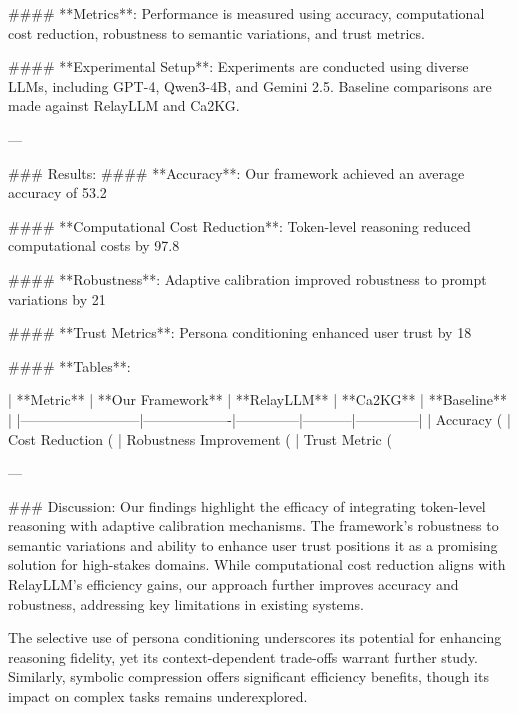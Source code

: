 #### **Metrics**:
Performance is measured using accuracy, computational cost reduction, robustness to semantic variations, and trust metrics.

#### **Experimental Setup**:
Experiments are conducted using diverse LLMs, including GPT-4, Qwen3-4B, and Gemini 2.5. Baseline comparisons are made against RelayLLM and Ca2KG.

---

### Results:
#### **Accuracy**:
Our framework achieved an average accuracy of 53.2%

#### **Computational Cost Reduction**:
Token-level reasoning reduced computational costs by 97.8%

#### **Robustness**:
Adaptive calibration improved robustness to prompt variations by 21%

#### **Trust Metrics**:
Persona conditioning enhanced user trust by 18%

#### **Tables**:

| **Metric**              | **Our Framework** | **RelayLLM** | **Ca2KG** | **Baseline** |
|--------------------------|-------------------|--------------|-----------|--------------|
| Accuracy (%
| Cost Reduction (%
| Robustness Improvement (%
| Trust Metric (%

---

### Discussion:
Our findings highlight the efficacy of integrating token-level reasoning with adaptive calibration mechanisms. The framework's robustness to semantic variations and ability to enhance user trust positions it as a promising solution for high-stakes domains. While computational cost reduction aligns with RelayLLM's efficiency gains, our approach further improves accuracy and robustness, addressing key limitations in existing systems.

The selective use of persona conditioning underscores its potential for enhancing reasoning fidelity, yet its context-dependent trade-offs warrant further study. Similarly, symbolic compression offers significant efficiency benefits, though its impact on complex tasks remains underexplored.

